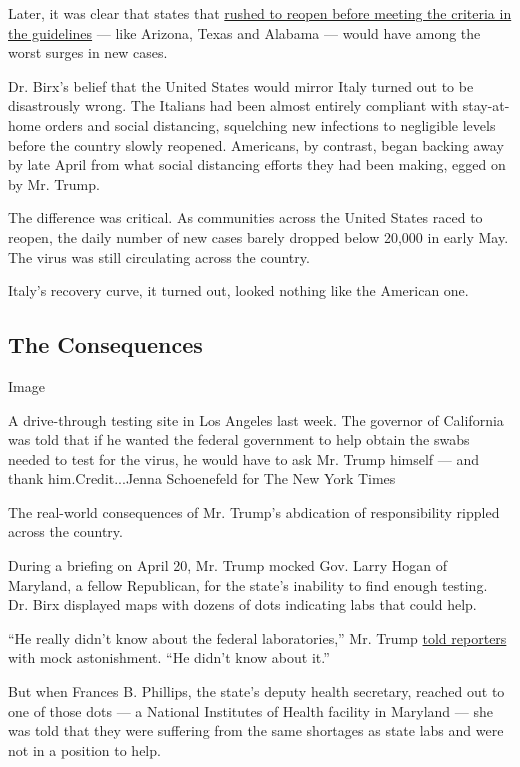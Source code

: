 Later, it was clear that states that
\href{https://www.nytimes.com/interactive/2020/05/07/us/coronavirus-states-reopen-criteria.html}{rushed
to reopen before meeting the criteria in the guidelines} --- like
Arizona, Texas and Alabama --- would have among the worst surges in new
cases.

Dr. Birx's belief that the United States would mirror Italy turned out
to be disastrously wrong. The Italians had been almost entirely
compliant with stay-at-home orders and social distancing, squelching new
infections to negligible levels before the country slowly reopened.
Americans, by contrast, began backing away by late April from what
social distancing efforts they had been making, egged on by Mr. Trump.

The difference was critical. As communities across the United States
raced to reopen, the daily number of new cases barely dropped below
20,000 in early May. The virus was still circulating across the country.

Italy's recovery curve, it turned out, looked nothing like the American
one.

\hypertarget{the-consequences}{%
\subsection{The Consequences}\label{the-consequences}}

Image

A drive-through testing site in Los Angeles last week. The governor of
California was told that if he wanted the federal government to help
obtain the swabs needed to test for the virus, he would have to ask Mr.
Trump himself --- and thank him.Credit...Jenna Schoenefeld for The New
York Times

The real-world consequences of Mr. Trump's abdication of responsibility
rippled across the country.

During a briefing on April 20, Mr. Trump mocked Gov. Larry Hogan of
Maryland, a fellow Republican, for the state's inability to find enough
testing. Dr. Birx displayed maps with dozens of dots indicating labs
that could help.

``He really didn't know about the federal laboratories,'' Mr. Trump
\href{https://www.whitehouse.gov/briefings-statements/remarks-president-trump-vice-president-pence-members-coronavirus-task-force-press-briefing-29/}{told
reporters} with mock astonishment. ``He didn't know about it.''

But when Frances B. Phillips, the state's deputy health secretary,
reached out to one of those dots --- a National Institutes of Health
facility in Maryland --- she was told that they were suffering from the
same shortages as state labs and were not in a position to help.

